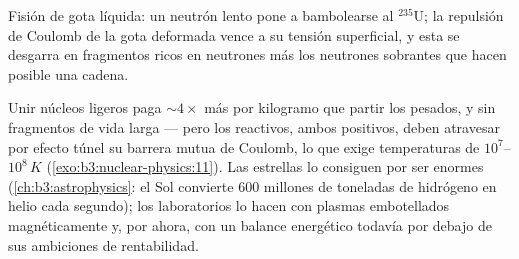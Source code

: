 \begin{omfigure}

{\small Fisión de gota líquida: un neutrón lento pone a bambolearse al
$^{235}$U; la repulsión de Coulomb de la gota deformada vence a su tensión
superficial, y esta se desgarra en fragmentos ricos en neutrones más los neutrones
sobrantes que hacen posible una cadena.}
\end{omfigure}

\begin{remark}\label{rem:b3:nuclear-physics:fusion}
Unir núcleos ligeros paga $\sim4\times$ más por kilogramo que
partir los pesados, y sin fragmentos de vida larga --- pero los
reactivos, ambos positivos, deben atravesar por efecto túnel su barrera
mutua de Coulomb, lo que exige temperaturas de $10^7$--$10^8\,\unit{K}$
(\cref{exo:b3:nuclear-physics:11}). Las estrellas lo consiguen por ser enormes
(\cref{ch:b3:astrophysics}: el Sol convierte \qty{600}{} millones de
toneladas de hidrógeno en helio cada segundo); los laboratorios lo hacen
con plasmas embotellados magnéticamente y, por ahora, con un balance energético
todavía por debajo de sus ambiciones de rentabilidad.
\end{remark}

